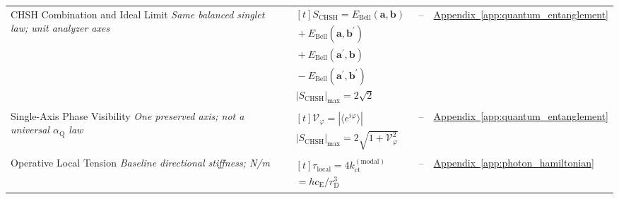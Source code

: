 \begin{longtable}{@{} p{4.5cm} p{6cm} c p{4cm} @{}}
{\raggedright CHSH Combination and Ideal Limit \newline \textit{Same balanced singlet law; unit analyzer axes}\par} & {\raggedright $\begin{gathered}[t]S_{\mathrm{CHSH}}=E_{\mathrm{Bell}}(\mathbf a,\mathbf b) \\ {}+E_{\mathrm{Bell}}(\mathbf a,\mathbf b^{\prime}) \\ {}+E_{\mathrm{Bell}}(\mathbf a^{\prime},\mathbf b) \\ {}-E_{\mathrm{Bell}}(\mathbf a^{\prime},\mathbf b^{\prime}) \\ |S_{\mathrm{CHSH}}|_{\max}=2\sqrt2\end{gathered}$\par} & -- & {\raggedright \hyperref[app:quantum_entanglement]{Appendix~\ref*{app:quantum_entanglement}}\par} \\

{\raggedright Single-Axis Phase Visibility \newline \textit{One preserved axis; not a universal $\alpha_{\mathrm Q}$ law}\par} & {\raggedright $\begin{gathered}[t]\mathcal V_\varphi=|\langle e^{i\varphi}\rangle| \\ |S_{\mathrm{CHSH}}|_{\max}=2\sqrt{1+\mathcal V_\varphi^2}\end{gathered}$\par} & -- & {\raggedright \hyperref[app:quantum_entanglement]{Appendix~\ref*{app:quantum_entanglement}}\par} \\

{\raggedright Operative Local Tension \newline \textit{Baseline directional stiffness; N/m}\par} & {\raggedright $\begin{gathered}[t]\tau_{\mathrm{local}}=4k_{\mathrm{ct}}^{(\mathrm{modal})} \\ =hc_{\mathrm E}/r_{\mathrm D}^3\end{gathered}$\par} & -- & {\raggedright \hyperref[app:photon_hamiltonian]{Appendix~\ref*{app:photon_hamiltonian}}\par} \\


\end{longtable}
